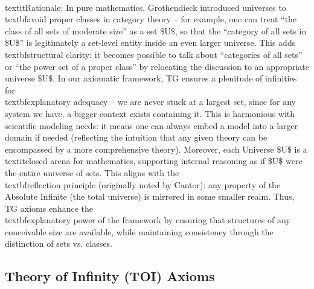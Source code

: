 \documentclass[11pt]{article}
\begin{document}
    \\textit{Rationale:} In pure mathematics, Grothendieck introduced universes to \\textbf{avoid proper classes} in category theory – for example, one can treat “the class of all sets of moderate size” as a set \$U\$, so that the “category of all sets in \$U\$” is legitimately a set-level entity inside an even larger universe. This adds \\textbf{structural clarity}: it becomes possible to talk about “categories of all sets” or “the power set of a proper class” by relocating the discussion to an appropriate universe \$U\$. In our axiomatic framework, TG ensures a plenitude of infinities for \\textbf{explanatory adequacy} – we are never stuck at a largest set, since for any system we have, a bigger context exists containing it. This is harmonious with scientific modeling needs: it means one can always embed a model into a larger domain if needed (reflecting the intuition that any given theory can be encompassed by a more comprehensive theory). Moreover, each Universe \$U\$ is a \\textit{closed arena} for mathematics, supporting internal reasoning as if \$U\$ were the entire universe of sets. This aligns with the \\textbf{reflection principle} (originally noted by Cantor): any property of the Absolute Infinite (the total universe) is mirrored in some smaller realm. Thus, TG axioms enhance the \\textbf{explanatory power} of the framework by ensuring that structures of any conceivable size are available, while maintaining consistency through the distinction of sets vs. classes.

\subsection*{Theory of Infinity (TOI) Axioms}
\end{document}
